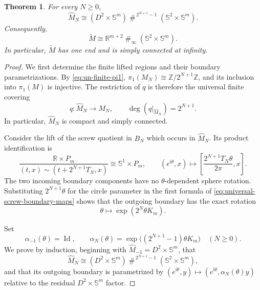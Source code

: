 \documentclass[11pt,reqno]{amsart}
\newtheorem{theorem}{Theorem}[section]
\theoremstyle{definition}
\numberwithin{equation}{section}
\begin{document}
\begin{theorem}\label{thm:universal-cover-topology}
For every \(N\ge0\),
\[
 \widehat M_N\cong
 (D^2\times\mathbb S^m)
 \mathbin{\#}^{\,2^{N+1}-1}
 (\mathbb S^2\times\mathbb S^m).
\]
Consequently,
\[
 \widetilde M\cong
 \mathbb R^{m+2}\mathbin{\#}_{\infty}
 (\mathbb S^2\times\mathbb S^m).
\]
In particular, \(\widetilde M\) has one end and is simply connected at
infinity.
\end{theorem}

\begin{proof}
We first determine the finite lifted regions and their boundary
parametrizations.  By \eqref{eq:un-finite-pi1},
\(\pi_1(M_N)\cong\mathbb Z/2^{N+1}\mathbb Z\), and its inclusion into
\(\pi_1(M)\) is injective.  The restriction of \(q\) is therefore the
universal finite covering
\begin{equation}\label{eq:universal-finite-cover}
 q:\widehat M_N\longrightarrow M_N,
 \qquad \deg(q|_{\widehat M_N})=2^{N+1}.
\end{equation}
In particular, \(\widehat M_N\) is compact and simply connected.

Consider the lift of the screw quotient in \(B_N\) which occurs in
\(\widehat M_N\).  Its product identification is
\begin{equation}\label{eq:universal-cyclic-lift}
 \frac{\mathbb R\times P_m}
 {(t,x)\sim(t+2^{N+1}T_N,x)}
 \cong\mathbb S^1\times P_m,
 \qquad
 (e^{\mathrm i\theta},x)
 \longmapsto
 \left[\frac{2^{N+1}T_N\theta}{2\pi},x\right].
\end{equation}
The two incoming boundary components have no
\(\theta\)-dependent sphere rotation.  Substituting
\(2^{N+1}\theta\) for the circle parameter in the first formula of
\eqref{eq:universal-screw-boundary-maps} shows that the outgoing
boundary has the exact rotation
\begin{equation}\label{eq:universal-lifted-twist}
 \theta\longmapsto\exp(2^N\theta K_m).
\end{equation}

Set
\begin{equation}\label{eq:universal-boundary-framing}
 \alpha_{-1}(\theta)=\operatorname{Id},
 \qquad
 \alpha_N(\theta)
 =\exp\bigl((2^{N+1}-1)\theta K_m\bigr)
 \quad(N\ge0).
\end{equation}
We prove by induction, beginning with
\(\widehat M_{-1}=D^2\times\mathbb S^m\), that
\begin{equation}\label{eq:universal-finite-core}
 \widehat M_N\cong
 (D^2\times\mathbb S^m)
 \mathbin{\#}^{\,2^{N+1}-1}
 (\mathbb S^2\times\mathbb S^m),
\end{equation}
and that its outgoing boundary is parametrized by
\((e^{\mathrm i\theta},y)\mapsto
(e^{\mathrm i\theta},\alpha_N(\theta)y)\) relative to the residual
\(D^2\times\mathbb S^m\) factor.


\end{proof}
\end{document}
